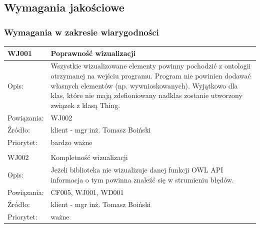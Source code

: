 \subsection{Wymagania jakościowe}


\subsubsection{Wymagania w zakresie wiarygodności}



\begin{center}

\begin{tabular}{|m{3cm}|m{9cm}|} \hline

WJ001 & Poprawność wizualizacji \\ \hline
Opis: & Wszystkie wizualizowane elementy powinny pochodzić z ontologii otrzymanej na wejściu programu. Program nie powinien dodawać własnych elementów (np. wywnioskowanych). Wyjątkowo dla klas, które nie mają zdefioniowany nadklas zostanie utworzony związek z klasą Thing. \\ \hline
Powiązania: & WJ002 \\ \hline
Źródło: &  klient - mgr inż. Tomasz Boiński \\ \hline
Priorytet: & bardzo ważne \\ \hline

\multicolumn{2}{c}{} \\
 \hline

WJ002 & Kompletność wizualizacji \\ \hline
Opis: & Jeżeli biblioteka nie wizualizuje danej funkcji OWL API informacja o tym powinna znaleźć się w strumieniu błędów. \\ \hline
Powiązania: & CF005, WJ001, WD001 \\ \hline
Źródło: & klient - mgr inż. Tomasz Boiński \\ \hline
Priorytet: & ważne \\ \hline

\end{tabular}

\end{center}

